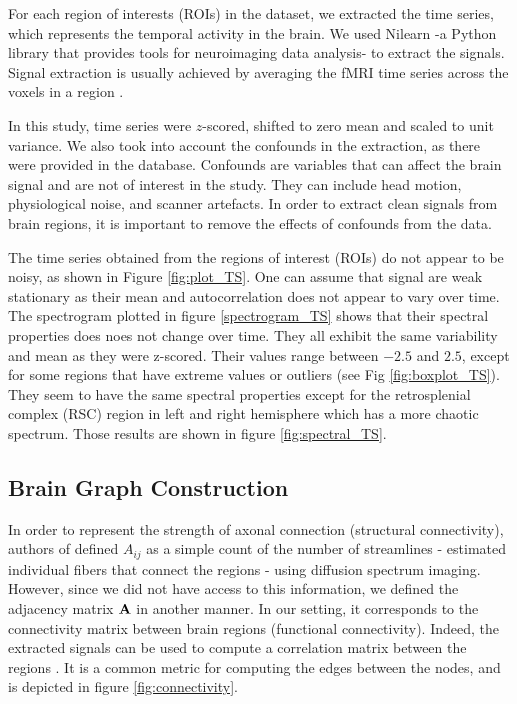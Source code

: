 For each region of interests (ROIs) in the dataset, we extracted the time series, which represents the temporal activity in the brain. We used Nilearn -a Python library that provides tools for neuroimaging data analysis- to extract the signals.
Signal extraction is usually achieved by averaging the fMRI time series across the voxels in a region \cite{varoquaux_learning_2013}. 

In this study, time series were $z$-scored, \ie shifted to zero mean and scaled to unit variance. We also took into account the confounds in the extraction, as there were provided in the database. Confounds are variables that can affect the brain signal and are not of interest in the study. They can include head motion, physiological noise, and scanner artefacts. In order to extract clean signals from brain regions, it is important to remove the effects of confounds from the data. 

The time series obtained from the regions of interest (ROIs) do not appear to be noisy, as shown in Figure \ref{fig:plot_TS}. One can assume that signal are weak stationary as their mean and autocorrelation does not appear to vary over time. The spectrogram plotted in figure \ref{spectrogram_TS} shows that their spectral properties does noes not change over time. They all exhibit the same variability and mean as they were z-scored. Their values range between $-2.5$ and $2.5$, except for some regions that have extreme values or outliers (see Fig \ref{fig:boxplot_TS}). They seem to have the same spectral properties except for the retrosplenial complex (RSC) region in left and right hemisphere which has a more chaotic spectrum. Those results are shown in figure \ref{fig:spectral_TS}.

\subsection{Brain Graph Construction}

In order to represent the strength of axonal connection (structural connectivity), authors of \cite{huang_graph_2018} defined $A_{ij}$ as a simple count of the number of streamlines - \ie estimated individual fibers that connect the regions - using diffusion spectrum imaging. However, since we did not have access to this information, we defined the adjacency matrix $\mathbf{A}$ in another manner. In our setting, it corresponds to the connectivity matrix between brain regions (functional connectivity). Indeed, the extracted signals can be used to compute a correlation matrix between the regions \cite{varoquaux_learning_2013}. It is a common metric for computing the edges between the nodes, and is depicted in figure \ref{fig:connectivity}.


